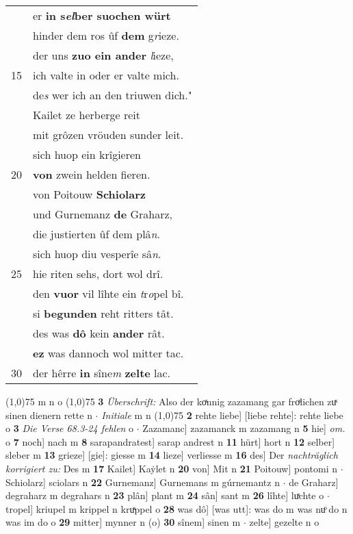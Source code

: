 \documentclass[8pt,a4paper,notitlepage]{article}
\begin{document}
\begin{table}[ht]
\begin{minipage}[t]{0.5\linewidth}
\begin{tabular}{rl}
 & er \textbf{in s\textit{el}ber suochen würt}\\ 
 & hinder dem ros ûf \textbf{dem} g\textit{r}ieze.\\ 
 & der uns \textbf{zuo ein ander} \textit{l}ieze,\\ 
15 & ich valte in oder er valte mich.\\ 
 & de\textit{s} wer ich an den triuwen dich."\\ 
 & Kailet ze herberge reit\\ 
 & mit grôzen vröuden sunder leit.\\ 
 & sich huop ein krîgieren\\ 
20 & \textbf{von} zwein helden fieren.\\ 
 & von Poitouw \textbf{Schiolarz}\\ 
 & und Gurnemanz \textbf{de} Graharz,\\ 
 & die justierten ûf dem plâ\textit{n}.\\ 
 & sich huop diu vesperîe sâ\textit{n}.\\ 
25 & hie riten sehs, dort wol drî.\\ 
 & den \textbf{vuor} vil lîhte ein \textit{t}r\textit{o}pel bî.\\ 
 & si \textbf{begunden} reht ritters tât.\\ 
 & des was \textbf{dô} kein \textbf{ander} rât.\\ 
 & \textbf{ez} was dannoch wol mitter tac.\\ 
30 & der hêrre \textbf{in} sîne\textit{m} \textbf{zelte} lac.\\ 
\end{tabular}
\scriptsize
\line(1,0){75} \newline
m n o \newline
\line(1,0){75} \newline
\textbf{3} \textit{Überschrift:} Also der koͯnnig zazamang gar froͯlichen zuͯ sinen dienern rette n   $\cdot$ \textit{Initiale} m n  \newline
\line(1,0){75} \newline
\textbf{2} rehte liebe] [liebe rehte]: rehte liebe o \textbf{3} \textit{Die Verse 68.3-24 fehlen} o   $\cdot$ Zazamanc] zazamanck m zazamang n \textbf{5} hie] \textit{om.} o \textbf{7} noch] nach m \textbf{8} sarapandratest] sarap andrest n \textbf{11} hürt] hort n \textbf{12} selber] sleber m \textbf{13} grieze] [gie]: giesse m \textbf{14} lieze] verliesse m \textbf{16} des] Der \textit{nachträglich korrigiert zu:} Des m \textbf{17} Kailet] Kaẏlet n \textbf{20} von] Mit n \textbf{21} Poitouw] pontomi n  $\cdot$ Schiolarz] sciolars n \textbf{22} Gurnemanz] Gurnemans m gúrnemantz n  $\cdot$ de Graharz] degraharz m degrahars n \textbf{23} plân] plant m \textbf{24} sân] sant m \textbf{26} lîhte] luͯchte o  $\cdot$ tropel] kriupel m krippel n kruͯppel o \textbf{28} was dô] [was utt]: was do m was nuͦ do n was im do o \textbf{29} mitter] mynner n (o) \textbf{30} sînem] sinen m  $\cdot$ zelte] gezelte n o \newline
\end{minipage}
\end{table}
\end{document}
